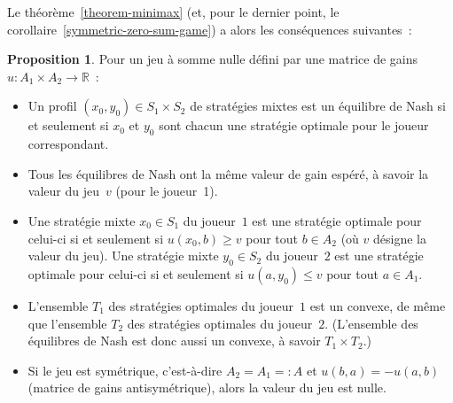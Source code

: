 \documentclass[12pt,a4paper]{article}
\theoremstyle{definition}
\newtheorem{prop}[comcnt]{Proposition}
\begin{document}
Le théorème \ref{theorem-minimax} (et, pour le dernier point, le
corollaire \ref{symmetric-zero-sum-game}) a alors les conséquences
suivantes :

\begin{prop}\label{minimax-for-games} Pour un jeu à somme nulle défini
par une matrice de gains $u \colon A_1 \times A_2 \to \mathbb{R}$ :
\begin{itemize}
\item[(i)] Un profil $(x_0,y_0) \in S_1\times S_2$ de stratégies
  mixtes est un équilibre de Nash si et seulement si $x_0$ et $y_0$
  sont chacun une stratégie optimale pour le joueur correspondant.
\item[(ii)] Tous les équilibres de Nash ont la même valeur de gain
  espéré, à savoir la valeur du jeu $v$ (pour le joueur 1).
\item[(iii)] Une stratégie mixte $x_0 \in S_1$ du joueur $1$ est une
  stratégie optimale pour celui-ci si et seulement si $u(x_0,b) \geq
  v$ pour tout $b\in A_2$ (où $v$ désigne la valeur du jeu).  Une
  stratégie mixte $y_0 \in S_2$ du joueur $2$ est une stratégie
  optimale pour celui-ci si et seulement si $u(a,y_0) \leq v$ pour
  tout $a\in A_1$.
\item[(iv)] L'ensemble $T_1$ des stratégies optimales du joueur $1$
  est un convexe, de même que l'ensemble $T_2$ des stratégies
  optimales du joueur $2$.  (L'ensemble des équilibres de Nash est
  donc aussi un convexe, à savoir $T_1 \times T_2$.)
\item[(v)] Si le jeu est symétrique, c'est-à-dire $A_2 = A_1 =: A$ et
  $u(b,a) = -u(a,b)$ (matrice de gains antisymétrique), alors la
  valeur du jeu est nulle.
\end{itemize}
\end{prop}
\end{document}
